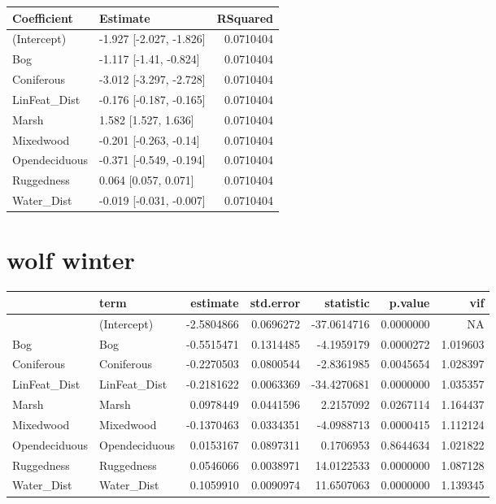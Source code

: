 \documentclass[]{article}
\begin{document}
\begin{tabular}{llr}
\toprule
Coefficient & Estimate & RSquared\\
\midrule
(Intercept) & -1.927 [-2.027, -1.826] & 0.0710404\\
Bog & -1.117 [-1.41, -0.824] & 0.0710404\\
Coniferous & -3.012 [-3.297, -2.728] & 0.0710404\\
LinFeat\_Dist & -0.176 [-0.187, -0.165] & 0.0710404\\
Marsh & 1.582 [1.527, 1.636] & 0.0710404\\
Mixedwood & -0.201 [-0.263, -0.14] & 0.0710404\\
Opendeciduous & -0.371 [-0.549, -0.194] & 0.0710404\\
Ruggedness & 0.064 [0.057, 0.071] & 0.0710404\\
Water\_Dist & -0.019 [-0.031, -0.007] & 0.0710404\\
\bottomrule
\end{tabular}

\section{wolf winter}\label{wolf-winter}

\begin{tabular}{llrrrrr}
\toprule
  & term & estimate & std.error & statistic & p.value & vif\\
\midrule
 & (Intercept) & -2.5804866 & 0.0696272 & -37.0614716 & 0.0000000 & NA\\
Bog & Bog & -0.5515471 & 0.1314485 & -4.1959179 & 0.0000272 & 1.019603\\
Coniferous & Coniferous & -0.2270503 & 0.0800544 & -2.8361985 & 0.0045654 & 1.028397\\
LinFeat\_Dist & LinFeat\_Dist & -0.2181622 & 0.0063369 & -34.4270681 & 0.0000000 & 1.035357\\
Marsh & Marsh & 0.0978449 & 0.0441596 & 2.2157092 & 0.0267114 & 1.164437\\
Mixedwood & Mixedwood & -0.1370463 & 0.0334351 & -4.0988713 & 0.0000415 & 1.112124\\
Opendeciduous & Opendeciduous & 0.0153167 & 0.0897311 & 0.1706953 & 0.8644634 & 1.021822\\
Ruggedness & Ruggedness & 0.0546066 & 0.0038971 & 14.0122533 & 0.0000000 & 1.087128\\
Water\_Dist & Water\_Dist & 0.1059910 & 0.0090974 & 11.6507063 & 0.0000000 & 1.139345\\
\bottomrule
\end{tabular}
\end{document}
